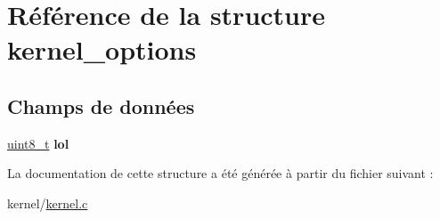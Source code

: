 \hypertarget{structkernel__options}{\section{Référence de la structure kernel\-\_\-options}
\label{structkernel__options}
}
\subsection*{Champs de données}
\begin{DoxyCompactItemize}
\item 
\hypertarget{structkernel__options_aaf8b5378f13106d9ddbc9e392e7f0367}{\hyperlink{kernel_2include_2types_8h_aba7bc1797add20fe3efdf37ced1182c5}{uint8\-\_\-t} {\bfseries lol}}\label{structkernel__options_aaf8b5378f13106d9ddbc9e392e7f0367}

\end{DoxyCompactItemize}


La documentation de cette structure a été générée à partir du fichier suivant \-:\begin{DoxyCompactItemize}
\item 
kernel/\hyperlink{kernel_8c}{kernel.\-c}\end{DoxyCompactItemize}
